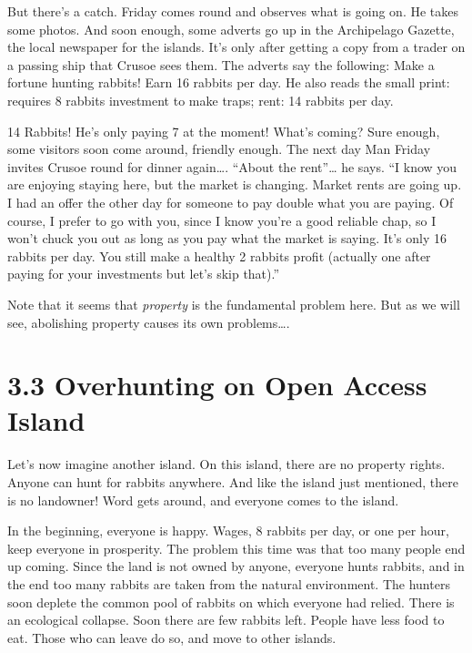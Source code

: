 \documentclass[]{tufte-handout}
\begin{document}
But there's a catch. Friday comes round and observes what is going on.
He takes some photos. And soon enough, some adverts go up in the
Archipelago Gazette, the local newspaper for the islands. It's only
after getting a copy from a trader on a passing ship that Crusoe sees
them. The adverts say the following: Make a fortune hunting rabbits!
Earn 16 rabbits per day. He also reads the small print: requires 8
rabbits investment to make traps; rent: 14 rabbits per day.

14 Rabbits! He's only paying 7 at the moment! What's coming? Sure
enough, some visitors soon come around, friendly enough. The next day
Man Friday invites Crusoe round for dinner again\ldots{}. ``About the
rent''\ldots{} he says. ``I know you are enjoying staying here, but the
market is changing. Market rents are going up. I had an offer the other
day for someone to pay double what you are paying. Of course, I prefer
to go with you, since I know you're a good reliable chap, so I won't
chuck you out as long as you pay what the market is saying. It's only 16
rabbits per day. You still make a healthy 2 rabbits profit (actually one
after paying for your investments but let's skip that).''

Note that it seems that \emph{property} is the fundamental problem here.
But as we will see, abolishing property causes its own problems\ldots{}.

\hypertarget{overhunting-on-open-access-island}{%
\section{3.3 Overhunting on Open Access
Island}\label{overhunting-on-open-access-island}}

Let's now imagine another island. On this island, there are no property
rights. Anyone can hunt for rabbits anywhere. And like the island just
mentioned, there is no landowner! Word gets around, and everyone comes
to the island.

In the beginning, everyone is happy. Wages, 8 rabbits per day, or one
per hour, keep everyone in prosperity. The problem this time was that
too many people end up coming. Since the land is not owned by anyone,
everyone hunts rabbits, and in the end too many rabbits are taken from
the natural environment. The hunters soon deplete the common pool of
rabbits on which everyone had relied. There is an ecological collapse.
Soon there are few rabbits left. People have less food to eat. Those who
can leave do so, and move to other islands.
\end{document}
